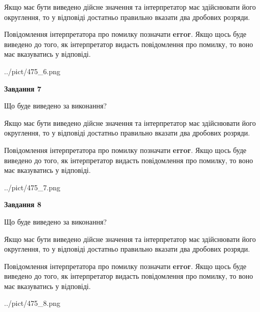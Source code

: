 \documentclass[12pt, ukrainian]{article}
\begin{document}
{\begin {Large}
Якщо має бути виведено дійсне значення та інтерпретатор має здійснювати його округлення, 
то у відповіді достатньо правильно вказати два дробових розряди.

Повідомлення інтерпретатора про помилку позначати \textbf{error}.
Якщо щось буде виведено до того, як інтерпретатор видасть повідомлення про помилку, 
то воно має вказуватись у відповіді. \par

\begin{center}
	{../pict/475_6.png}
\end{center}
\newpage

{\begin {center}\textbf{Завдання 7}\end {center}}\par
Що буде виведено за виконання? \par

Якщо має бути виведено дійсне значення та інтерпретатор має здійснювати його округлення, 
то у відповіді достатньо правильно вказати два дробових розряди.

Повідомлення інтерпретатора про помилку позначати \textbf{error}.
Якщо щось буде виведено до того, як інтерпретатор видасть повідомлення про помилку, 
то воно має вказуватись у відповіді. \par

\begin{center}
	{../pict/475_7.png}
\end{center}
\newpage

{\begin {center}\textbf{Завдання 8}\end {center}}\par
Що буде виведено за виконання? \par

Якщо має бути виведено дійсне значення та інтерпретатор має здійснювати його округлення, 
то у відповіді достатньо правильно вказати два дробових розряди.

Повідомлення інтерпретатора про помилку позначати \textbf{error}.
Якщо щось буде виведено до того, як інтерпретатор видасть повідомлення про помилку, 
то воно має вказуватись у відповіді. \par

\begin{center}
	{../pict/475_8.png}
\end{center}
\newpage


\end{Large}}
\end{document}
